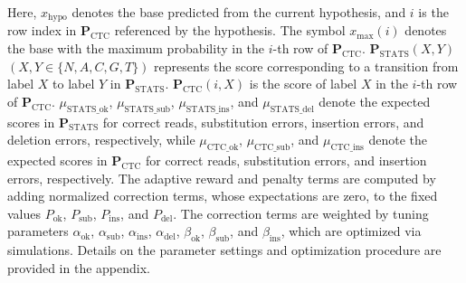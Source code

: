 \documentclass[sotsuron]{kuee}
\begin{document}
Here, $x_{\mathrm{hypo}}$ denotes the base predicted from the current hypothesis, and $i$ is the row index in
$\bm{P}_{\mathrm{CTC}}$ referenced by the hypothesis.
The symbol $x_{\mathrm{max}}(i)$ denotes the base with the maximum probability in the $i$-th row of $\bm{P}_{\mathrm{CTC}}$.
$\bm{P}_{\mathrm{STATS}}(X,Y)$ $(X,Y\in \{N,A,C,G,T\})$ represents the score corresponding to a transition
from label $X$ to label $Y$ in $\bm{P}_{\mathrm{STATS}}$.
$\bm{P}_{\mathrm{CTC}}(i,X)$ is the score of label $X$ in the $i$-th row of $\bm{P}_{\mathrm{CTC}}$.
$\mu_{\mathrm{STATS}\_\mathrm{ok}}$, $\mu_{\mathrm{STATS}\_\mathrm{sub}}$,
$\mu_{\mathrm{STATS}\_\mathrm{ins}}$, and $\mu_{\mathrm{STATS}\_\mathrm{del}}$ denote the expected scores in
$\bm{P}_{\mathrm{STATS}}$ for correct reads, substitution errors, insertion errors, and deletion errors,
respectively,
while $\mu_{\mathrm{CTC}\_\mathrm{ok}}$, $\mu_{\mathrm{CTC}\_\mathrm{sub}}$, and
$\mu_{\mathrm{CTC}\_\mathrm{ins}}$ denote the expected scores in $\bm{P}_{\mathrm{CTC}}$ for correct reads,
substitution errors, and insertion errors, respectively.
The adaptive reward and penalty terms are computed by adding normalized correction terms, whose expectations
are zero, to the fixed values $P_{\mathrm{ok}}$, $P_{\mathrm{sub}}$, $P_{\mathrm{ins}}$, and $P_{\mathrm{del}}$.
The correction terms are weighted by tuning parameters $\alpha_{\mathrm{ok}}$, $\alpha_{\mathrm{sub}}$,
$\alpha_{\mathrm{ins}}$, $\alpha_{\mathrm{del}}$, $\beta_{\mathrm{ok}}$, $\beta_{\mathrm{sub}}$, and
$\beta_{\mathrm{ins}}$, which are optimized via simulations.
Details on the parameter settings and optimization procedure are provided in the appendix.
\end{document}
